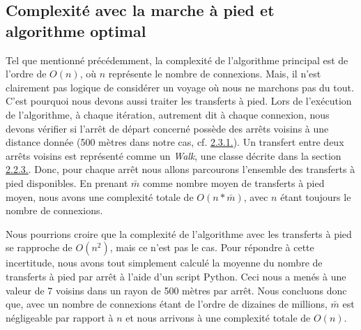 \documentclass[12pt]{article}
\begin{document}
\subsection{Complexité avec la marche à pied et algorithme optimal}
Tel que mentionné précédemment, la complexité de l'algorithme principal est de l'ordre de $O(n)$, où $n$ représente le nombre de connexions. Mais, il n'est clairement pas logique
de considérer un voyage où nous ne marchons pas du tout. C'est pourquoi nous devons aussi traiter les transferts à pied. Lors de l'exécution de
l'algorithme, à chaque itération, autrement dit à chaque connexion, nous devons vérifier si l'arrêt de départ concerné possède des arrêts voisins à une distance
donnée (500 mètres dans notre cas, cf. \hyperref[sec:complexitetempinit]{2.3.1.}). Un transfert entre deux arrêts voisins est représenté comme un \emph{Walk}, une
classe décrite dans la section \hyperref[sec:walk]{2.2.3.}. Donc, pour chaque arrêt nous allons parcourons l'ensemble des transferts à pied disponibles.
En prenant $\bar{m}$ comme nombre moyen de transferts à pied moyen, nous avons une complexité totale de $O(n * \bar{m})$, avec $n$ étant toujours le nombre de connexions.

Nous pourrions croire que la complexité de l'algorithme avec les transferts à pied se rapproche de $O(n^2)$, mais ce n'est pas le cas. Pour répondre à cette incertitude,
nous avons tout simplement calculé la moyenne du nombre de transferts à pied par arrêt à l'aide d'un script Python. Ceci nous a menés à une valeur de 7 voisins dans un
rayon de 500 mètres par arrêt. Nous concluons donc que, avec un nombre de connexions étant de l'ordre de dizaines de millions, $\bar{m}$ est négligeable par rapport à $n$ et
nous arrivons à une complexité totale de $O(n)$.
\end{document}
